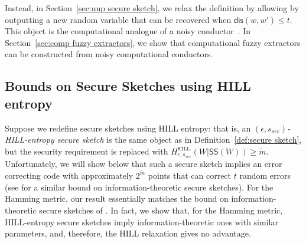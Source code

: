 \documentclass[11pt]{article}
\newcommand{\secref}[1]{\mbox{Section~\ref{#1}}}
\newcommand{\class}[1]{{\ensuremath{\mathsf{#1}}}}
\newcommand{\sketch}{\ensuremath{\class{SS}}\xspace}
\newcommand{\rec}{\ensuremath{\class{Rec}}\xspace}
\newcommand{\dis}{\ensuremath{\mathsf{dis}}}
\newcommand{\hill}{\ensuremath{\mathtt{HILL}}\xspace}
\begin{document}
Instead, in \secref{sec:unp secure sketch}, we relax the definition by allowing by outputting a new random variable that can be recovered when $\dis (w, w')\leq t$.  This object is the computational analogue of a noisy conductor~\cite{KanukurthiR09}.%
  In \secref{sec:comp fuzzy extractors}, we show that computational fuzzy extractors can be constructed from noisy computational conductors.


\subsection{Bounds on Secure Sketches using HILL entropy}
\label{sec:imp HILL sketch}
Suppose we redefine secure sketches using HILL entropy: that is, an \emph{$(\epsilon,s_{sec})$-HILL-entropy secure sketch} is the same object as in Definition~\ref{def:secure sketch}, but the security requirement is replaced with  $H^{\hill}_{\epsilon, s_{sec}}(W|\sketch(W))\geq \tilde{m}$. 
Unfortunately, we will show below that such a secure sketch implies an error correcting code with approximately $2^{\tilde{m}}$ points that can correct $t$ random errors (see  \cite[Lemma C.1]{DBLP:journals/siamcomp/DodisORS08} for a similar bound on information-theoretic secure sketches). For the Hamming metric, our result essentially matches the bound on information-theoretic secure sketches of \cite[Proposition 8.2]{DBLP:journals/siamcomp/DodisORS08}.  In fact, we show that, for the Hamming metric, HILL-entropy secure sketches imply information-theoretic ones with similar parameters, and, therefore, the HILL relaxation gives no advantage. 
\end{document}
